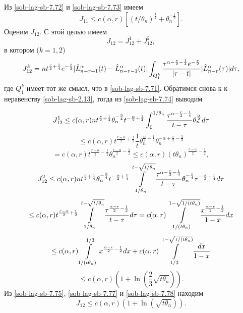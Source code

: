 Из \eqref{sob-lag-sb-7.72} и \eqref{sob-lag-sb-7.73} имеем
\begin{equation}\label{sob-lag-sb-7.74}
J_{11}\le c(\alpha,r)\left[(t/\theta_n)^{\frac{1}{2}}+\theta_n^{-\frac12}\right].
\end{equation}
Оценим $J_{12}$. С этой целью имеем
\begin{equation}\label{sob-lag-sb-7.75}
J_{12}=J_{12}^1+J_{12}^2,
\end{equation}
в котором ($k=1,2$)
\begin{equation}\label{sob-lag-sb-7.76}
J_{12}^k=nt^{\frac{r}{2}+\frac14}e^{-\frac{t}{2}}|\hat L_{n-r+1}^\alpha(t)-\hat L_{n-r-1}^\alpha(t)|\int_{Q_1^k}{\tau^{\alpha-\frac{r}{2}-\frac14}e^{-\frac{\tau}{2}}\over |\tau-t|}|\hat L_{n-r}^\alpha(\tau)|d\tau,
\end{equation}
где $Q_1^k$ имеет тот же смысл, что в \eqref{sob-lag-sb-7.71}. Обратимся снова к к неравенству \eqref{sob-lag-sb-2.13}, тогда из \eqref{sob-lag-sb-7.74} выводим

$$
J_{12}^1\le c(\alpha,r)nt^{\frac{r}{2}+\frac14}\theta_n^{-\frac34}t^{-\frac{\alpha}{2}+\frac14}\int_0^{1/\theta_n}
{\tau^{\alpha-\frac{r}{2}-\frac14}\over t-\tau}\theta_n^{\frac{\alpha}{2}}d\tau
$$
 $$
 \le c(\alpha,r)t^{\frac{r-\alpha}{2}+\frac12}\frac{1}{t}\theta_n^{\frac{\alpha}{2}+\frac14}\theta_n^{-\alpha+\frac{r}{2}-\frac34}
 $$
 \begin{equation}\label{sob-lag-sb-7.77}
= c(\alpha,r)t^{\frac{r-\alpha}{2}-\frac12}\theta_n^{\frac{r-\alpha}{2}-\frac12}\le c(\alpha,r)(t\theta_n)^{\frac{r-\alpha}{2}-\frac12},
\end{equation}
$$
J_{12}^2\le c(\alpha,r)nt^{\frac{r}{2}+\frac14}\theta_n^{-\frac34}t^{-\frac{\alpha}{2}+\frac14}
\int\limits_{1/\theta_n}^{t-\sqrt{t/\theta_n}}
{\tau^{\alpha-\frac{r}{2}-\frac14}\over t-\tau}\theta_n^{-\frac{1}{4}}\tau^{-\frac{\alpha}{2}-\frac14}d\tau
$$
$$
\le c(\alpha,r)t^{\frac{r-\alpha}{2}+\frac12}\int\limits_{1/\theta_n}^{t-\sqrt{t/\theta_n}}
{\tau^{\frac{\alpha-r}{2}-\frac12}\over t-\tau}d\tau
= c(\alpha,r)\int\limits_{1/(t\theta_n)}^{1-\sqrt{1/(t\theta_n)}}{x^{\frac{\alpha-r}{2}-\frac12}\over 1-x}dx
$$
$$
\le c(\alpha,r)\int\limits_{1/(t\theta_n)}^{1/3}x^{\frac{\alpha-r}{2}-\frac12}dx+
c(\alpha,r)\int\limits_{1/3}^{1-\sqrt{1/(t\theta_n)}}{dx\over 1-x}
$$
 \begin{equation}\label{sob-lag-sb-7.78}
\le c(\alpha,r)\left(1+\ln\left(\frac23\sqrt{t\theta_n}\right)\right).
\end{equation}
Из \eqref{sob-lag-sb-7.75}, \eqref{sob-lag-sb-7.77} и \eqref{sob-lag-sb-7.78} находим
 \begin{equation}\label{sob-lag-sb-7.79}
J_{12}\le c(\alpha,r)\left(1+\ln\left(\sqrt{t\theta_n}\right)\right).
\end{equation}

